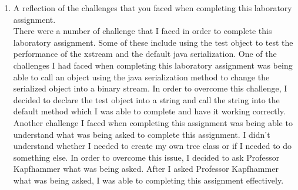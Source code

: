 \documentclass{article}
\begin{document}
\begin{enumerate}
\item A reflection of the challenges that you faced when completing this laboratory assignment.
\\
There were a number of challenge that I faced in order to complete this laboratory assignment. Some of these include using the test object to test the performance of the xstream and the default java serialization. One of the challenges I had faced when completing this laboratory assignment was being able to call an object using the java serialization method to change the serialized object into a binary stream. In order to overcome this challenge, I decided to declare the test object into a string and call the string into the default method which I was able to complete and have it working correctly. Another challenge I faced when completing this assignment was being able to understand what was being asked to complete this assignment. I didn't understand whether I needed to create my own tree class or if I needed to do something else. In order to overcome this issue, I decided to ask Professor Kapfhammer what was being asked. After I asked Professor Kapfhammer what was being asked, I was able to completing this assignment effectively.  



\end{enumerate}
\end{document}
